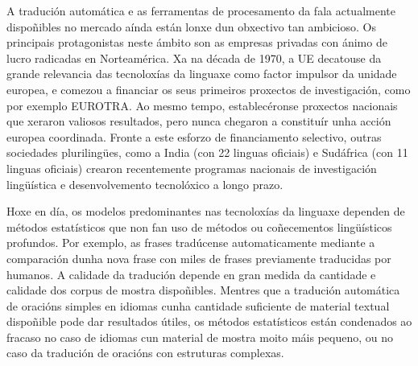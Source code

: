\begin{multicols}{2}
A tradución automática e as ferramentas de procesamento da fala actualmente dispoñibles no mercado aínda están lonxe dun obxectivo tan ambicioso. Os principais protagonistas neste ámbito son as empresas privadas con ánimo de lucro radicadas en Norteamérica. Xa na década de 1970, a UE decatouse da grande relevancia das tecnoloxías da linguaxe como factor impulsor da unidade europea, e comezou a financiar os seus primeiros proxectos de investigación, como por exemplo EUROTRA. Ao mesmo tempo, establecéronse proxectos nacionais que xeraron valiosos resultados, pero nunca chegaron a constituír unha acción europea coordinada. Fronte a este esforzo de financiamento selectivo, outras sociedades plurilingües, como a India (con 22 linguas oficiais) e Sudáfrica (con 11 linguas oficiais) crearon recentemente programas nacionais de investigación lingüística e desenvolvemento tecnolóxico a longo prazo.

Hoxe en día, os modelos predominantes nas tecnoloxías da linguaxe dependen de métodos estatísticos que non fan uso de métodos ou coñecementos lingüísticos profundos. Por exemplo, as frases tradúcense automaticamente mediante a comparación dunha nova frase con miles de frases previamente traducidas por humanos. A calidade da tradución depende en gran medida da cantidade e calidade dos corpus de mostra dispoñibles. Mentres que a tradución automática de oracións simples en idiomas cunha cantidade suficiente de material textual dispoñible pode dar resultados útiles, os métodos estatísticos están condenados ao fracaso no caso de idiomas cun material de mostra moito máis pequeno, ou no caso da tradución de oracións con estruturas complexas.



\end{multicols}
